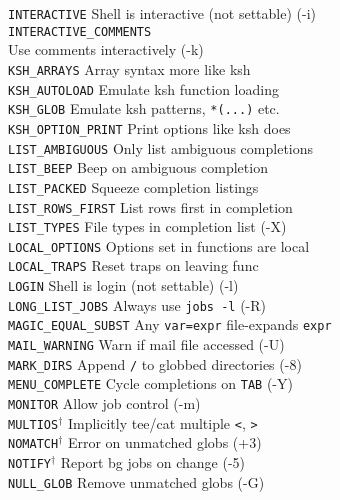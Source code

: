 \documentclass{article}
\newcommand\T[1]{\texttt{#1}}
\newcommand\D{$^\dag$}
\begin{document}
\begin{multicols}{3}
\begin{tabbing}
\T{INTERACTIVE}          \>\> Shell is interactive (not settable) (-i) \\
\T{INTERACTIVE\_COMMENTS} \\
                         \>\> Use comments interactively (-k) \\
\T{KSH\_ARRAYS}          \>\> Array syntax more like ksh \\
\T{KSH\_AUTOLOAD}        \>\> Emulate ksh function loading \\
\T{KSH\_GLOB}            \>\> Emulate ksh patterns, \verb!*(...)! etc. \\
\T{KSH\_OPTION\_PRINT}   \>\> Print options like ksh does \\
\T{LIST\_AMBIGUOUS}      \>\> Only list ambiguous completions \\
\T{LIST\_BEEP}           \>\> Beep on ambiguous completion \\
\T{LIST\_PACKED}         \>\> Squeeze completion listings \\
\T{LIST\_ROWS\_FIRST}    \>\> List rows first in completion \\
\T{LIST\_TYPES}          \>\> File types in completion list (-X) \\
\T{LOCAL\_OPTIONS}       \>\> Options set in functions are local \\
\T{LOCAL\_TRAPS}         \>\> Reset traps on leaving func \\
\T{LOGIN}                \>\> Shell is login (not settable) (-l) \\
\T{LONG\_LIST\_JOBS}     \>\> Always use \verb!jobs -l! (-R) \\
\T{MAGIC\_EQUAL\_SUBST}  \>\> Any \verb!var=expr! file-expands \T{expr} \\
\T{MAIL\_WARNING}        \>\> Warn if mail file accessed (-U) \\
\T{MARK\_DIRS}           \>\> Append \verb!/! to globbed directories (-8) \\
\T{MENU\_COMPLETE}       \>\> Cycle completions on \T{TAB} (-Y) \\
\T{MONITOR}              \>\> Allow job control (-m) \\
\T{MULTIOS}\D            \>\> Implicitly tee/cat multiple \verb!<!,
   \verb!>! \\
\T{NOMATCH}\D            \>\> Error on unmatched globs (+3) \\
\T{NOTIFY}\D             \>\> Report bg jobs on change (-5) \\
\T{NULL\_GLOB}           \>\> Remove unmatched globs (-G) \\

\end{tabbing}
\end{multicols}
\end{document}
